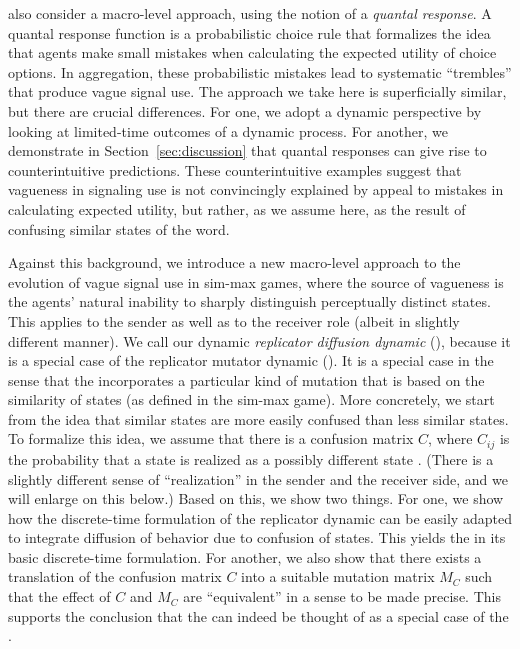 \citet{FrankeJager2010:Vagueness-Signa} also consider a macro-level
approach, using the notion of a \emph{quantal response}. A quantal
response function is a probabilistic choice rule that formalizes the
idea that agents make small mistakes when calculating the expected
utility of choice options. In aggregation, these probabilistic
mistakes lead to systematic ``trembles'' that produce vague signal
use. The approach we take here is superficially similar, but there are
crucial differences. For one, we adopt a dynamic perspective by
looking at limited-time outcomes of a dynamic process. For another, we
demonstrate in Section~\ref{sec:discussion} that quantal responses can
give rise to counterintuitive predictions. These counterintuitive
examples suggest that vagueness in signaling use is not convincingly
explained by appeal to mistakes in calculating expected utility, but
rather, as we assume here, as the result of confusing similar states
of the word.

Against this background, we introduce a new macro-level approach to
the evolution of vague signal use in sim-max games, where the source
of vagueness is the agents' natural inability to sharply distinguish
perceptually distinct states. This applies to the sender as well as to
the receiver role (albeit in slightly different manner). We call our
dynamic \emph{replicator diffusion dynamic} (\rdd), because it is a
special case of the replicator mutator dynamic (\rmd). It is a special
case in the sense that the \rdd incorporates a particular kind of
mutation that is based on the similarity of states (as defined in the
sim-max game). More concretely, we start from the idea that similar
states are more easily confused than less similar states. To formalize
this idea, we assume that there is a confusion matrix $C$, where
$C_{ij}$ is the probability that a state  is realized as a
possibly different state . (There is a slightly different
sense of ``realization'' in the sender and the receiver side, and we
will enlarge on this below.) Based on this, we show two things. For
one, we show how the discrete-time formulation of the replicator
dynamic can be easily adapted to integrate diffusion of behavior due
to confusion of states. This yields the \rdd in its basic
discrete-time formulation. For another, we also show that there exists
a translation of the confusion matrix $C$ into a suitable mutation
matrix $M_C$ such that the effect of $C$ and $M_C$ are ``equivalent''
in a sense to be made precise. This supports the conclusion that the
\rdd can indeed be thought of as a special case of the \rmd.

